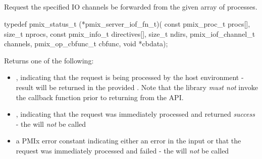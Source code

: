 \subsection{}

\summary

Request the specified IO channels be forwarded from the given array of processes.

\format

\cspecificstart
\begin{codepar}
typedef pmix_status_t (*pmix_server_iof_fn_t)(
                        const pmix_proc_t procs[], size_t nprocs,
                        const pmix_info_t directives[], size_t ndirs,
                        pmix_iof_channel_t channels,
                        pmix_op_cbfunc_t cbfunc, void *cbdata);
\end{codepar}
\cspecificend

\begin{arglist}
\end{arglist}

Returns one of the following:

\begin{itemize}
    \item {}, indicating that the request is being processed by the host environment - result will be returned in the provided . Note that the library \emph{must not} invoke the callback function prior to returning from the \ac{API}.
    \item {}, indicating that the request was immediately processed and returned \textit{success} - the  will \textit{not} be called
    \item a PMIx error constant indicating either an error in the input or that the request was immediately processed and failed - the  will \textit{not} be called
\end{itemize}


